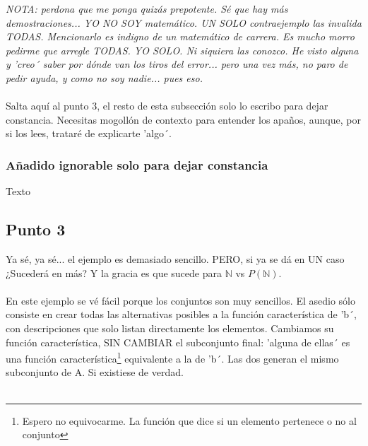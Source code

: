 	\noindent
	\textit{NOTA: perdona que me ponga quizás prepotente. Sé que hay más demostraciones... YO NO SOY matemático. UN SOLO contraejemplo las invalida TODAS. Mencionarlo es indigno de un matemático de carrera. Es mucho morro pedirme que arregle TODAS. YO SOLO. Ni siquiera las conozco. He visto alguna y 'creo´ saber por dónde van los tiros del error... pero una vez más, no paro de pedir ayuda, y como no soy nadie... pues eso.}\\\\
	
	\noindent
	Salta aquí al punto 3, el resto de esta subsección solo lo escribo para dejar constancia. Necesitas mogollón de contexto para entender los apaños, aunque, por si los lees, trataré de explicarte 'algo´.
	
	\subsubsection{Añadido ignorable solo para dejar constancia}
	
	Texto
	
	\subsection{Punto 3}
	
	\noindent
	Ya sé, ya sé... el ejemplo es demasiado sencillo. PERO, si ya se dá en UN caso ¿Sucederá en más? Y la gracia es que sucede para $\mathbb{N}$ vs $P(\mathbb{N})$.\\\\ 
	
	\noindent
	En este ejemplo se vé fácil porque los conjuntos son muy sencillos. El asedio sólo consiste en crear todas las alternativas posibles a la función característica de 'b´, con descripciones que solo listan directamente los elementos. Cambiamos su función característica, SIN CAMBIAR el subconjunto final: 'alguna de ellas´ es una función característica\footnote{Espero no equivocarme. La función que dice si un elemento pertenece o no al conjunto} equivalente a la de 'b´. Las dos generan el mismo subconjunto de A. Si existiese de verdad.\\\\
	
